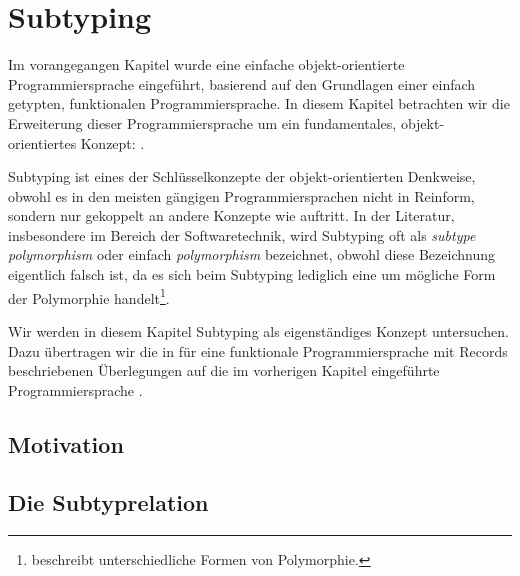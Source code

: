 

\chapter{Subtyping}
\label{kapitel:Subtyping}


Im vorangegangen Kapitel wurde eine einfache objekt-orientierte Programmiersprache eingef\"uhrt,
basierend auf den Grundlagen einer einfach getypten, funktionalen Programmiersprache. In diesem
Kapitel betrachten wir die Erweiterung dieser Programmiersprache um ein fundamentales,
objekt-orientiertes Konzept: .

Subtyping ist eines der Schl\"usselkonzepte der objekt-orientierten Denkweise, obwohl es in den
meisten g\"angigen Programmiersprachen nicht in Reinform, sondern nur gekoppelt an andere Konzepte
wie  auftritt. In der Literatur, insbesondere im Bereich der Softwaretechnik,
wird Subtyping oft als {\em subtype polymorphism} oder einfach {\em polymorphism} bezeichnet, obwohl
diese Bezeichnung eigentlich falsch ist, da es sich beim Subtyping lediglich eine um m\"ogliche Form
der Polymorphie handelt\footnote{\cite[S. 340f]{Pierce02} beschreibt unterschiedliche Formen
von Polymorphie.}.

Wir werden in diesem Kapitel Subtyping als eigenst\"andiges Konzept untersuchen. Dazu \"ubertragen wir
die in \cite[S. 182ff]{Pierce02} f\"ur eine funktionale Programmiersprache mit Records beschriebenen
\"Uberlegungen auf die im vorherigen Kapitel eingef\"uhrte Programmiersprache \Lot.



\section{Motivation}



\section{Die Subtyprelation}

